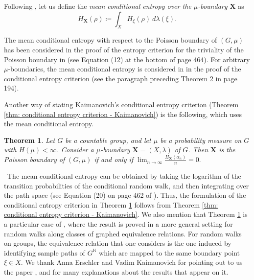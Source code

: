 \documentclass[reqno,oneside,11pt]{amsart}
\theoremstyle{plain}
\newtheorem{thm}{Theorem}[section] %
\theoremstyle{definition}
\begin{document}
Following \cite[Section 5.1]{Rohlin1967}, let us define the \emph{mean conditional entropy over the $\mu$-boundary $\mathbf{X}$} as
\begin{equation*}
	H_{\mathbf{X}}(\rho)\coloneqq \int_{X}H_{\xi}(\rho)\ d\lambda(\xi).
\end{equation*}

The mean conditional entropy with respect to the Poisson boundary of $(G,\mu)$ has been considered in the proof of the entropy criterion for the triviality of the Poisson boundary in \cite{KaimanovcihVershik1983} (see Equation (12) at the bottom of page 464). For arbitrary $\mu$-boundaries, the mean conditional entropy is considered in \cite{Kaimanovich1985conditional} in the proof of the conditional entropy criterion (see the paragraph preceding Theorem 2 in page 194).

Another way of stating Kaimanovich's conditional entropy criterion (Theorem \ref{thm: conditional entropy criterion - Kaimanovich}) is the following, which uses the mean conditional entropy.

\begin{thm}\label{thm: conditional entropy alternative formulation}
	Let $G$ be a countable group, and let $\mu$ be a probability measure on $G$ with $H(\mu)<\infty$. Consider a $\mu$-boundary $\mathbf{X}=(X,\lambda)$ of $G$. Then $\mathbf{X}$ is the Poisson boundary of $(G,\mu)$ if and only if $
		\lim_{n\to \infty}\frac{H_{\mathbf{X}}(\alpha_n)}{n}=0.$
\end{thm}\
The mean conditional entropy can be obtained by taking the logarithm of the transition probabilities of the conditional random walk, and then integrating over the path space (see Equation (20) on page 462 of \cite{KaimanovcihVershik1983}). Thus, the formulation of the conditional entropy criterion in Theorem \ref{thm: conditional entropy alternative formulation} follows from Theorem \ref{thm: conditional entropy criterion - Kaimanovich}. We also mention that Theorem \ref{thm: conditional entropy alternative formulation} is a particular case of \cite[Theorem 2.17]{KaimanovichSobieczky2012}, where the result is proved in a more general setting for random walks along classes of graphed equivalence relations. For random walks on groups, the equivalence relation that one considers is the one induced by identifying sample paths of $G^{\mathbb{N}}$ which are mapped to the same boundary point $\xi \in X$. We thank Anna Erschler and Vadim Kaimanovich for pointing out to us the paper \cite{Kaimanovich1985conditional}, and for many explanations about the results that appear on it.
\end{document}
